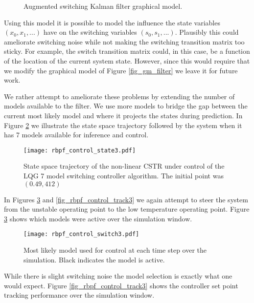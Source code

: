 \begin{enumerate}
\begin{figure}[H]
\caption{Augmented switching Kalman filter graphical model.}
\label{fig_gm_augmented}
\end{figure}
Using this model it is possible to model the influence the state variables $(x_0,x_1,...)$ have on the switching variables $(s_0, s_1,...)$. Plausibly this could ameliorate switching noise while not making the switching transition matrix too sticky. For example, the switch transition matrix could, in this case, be a function of the location of the current system state. However, since this would require that we modify the graphical model of Figure \ref{fig_gm_filter} we leave it for future work.
\end{enumerate}
We rather attempt to ameliorate these problems by extending the number of models available to the filter. We use more models to bridge the gap between the current most likely model and where it projects the states during prediction. In Figure \ref{fig_rbpf_control_state3} we illustrate the state space trajectory followed by the system when it has 7 models available for inference and control.
\begin{figure}[H] 
\centering
\texttt{[image: rbpf\_control\_state3.pdf]}
\caption{State space trajectory of the non-linear CSTR under control of the LQG 7 model switching controller algorithm. The initial point was $(0.49, 412)$}
\label{fig_rbpf_control_state3}
\end{figure}
In Figures \ref{fig_rbpf_control_switch3} and \ref{fig_rbpf_control_track3} we again attempt to steer the system from the unstable operating point to the low temperature operating point. Figure \ref{fig_rbpf_control_switch3} shows which models were active over the simulation window.
\begin{figure}[H] 
\centering
\texttt{[image: rbpf\_control\_switch3.pdf]}
\caption{Most likely model used for control at each time step over the simulation. Black indicates the model is active.}
\label{fig_rbpf_control_switch3}
\end{figure}
While there is slight switching noise the model selection is exactly what one would expect. Figure \ref{fig_rbpf_control_track3} shows the controller set point tracking performance over the simulation window.

